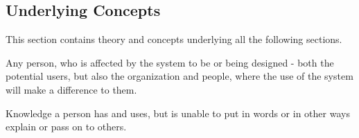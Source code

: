 \subsection{Underlying Concepts}
\label{sec:1_concepts}
This section contains theory and concepts underlying all the following sections.

\begin{definition}[Stakeholder] \label{def:stakeholder} 
  Any person, who is affected by the system to be or being designed - both
  the potential users, but also the organization and people, where the use of
  the system will make a difference to them.
  \cite[p. 50]{benyon_14}
\end{definition}

\begin{definition} \label{def:tatic_knowledge} 
  Knowledge a person has and uses, but is unable to put in words or in other ways explain or pass on to others.
\end{definition}
